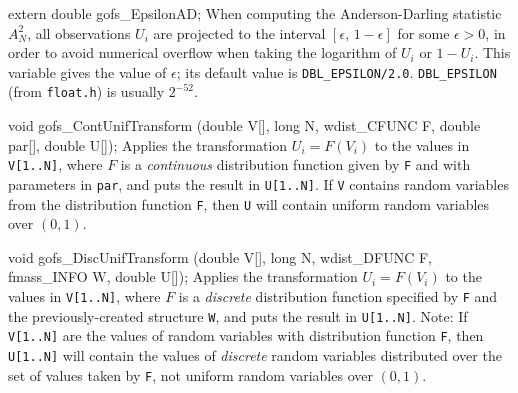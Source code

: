 extern double gofs_EpsilonAD;
\endcode
 \tab When computing the Anderson-Darling statistic $A_N^2$,
  all observations $U_i$ are projected to the interval
  $[\epsilon,\,1-\epsilon]$ for some $\epsilon > 0$, in order to
  avoid numerical overflow when taking the logarithm of $U_i$ or
  $1-U_i$.  This variable gives the value of $\epsilon$;
  its default value is {\tt DBL\_EPSILON/2.0}.
  {\tt DBL\_EPSILON} (from {\tt float.h}) is usually $2^{-52}$.
 \endtab
\fi %




\code

void gofs_ContUnifTransform (double V[], long N, wdist_CFUNC F,
                             double par[], double U[]);
\endcode
\tab  Applies the transformation $U_i = F(V_i)$ to the values in
  {\tt V[1..N]}, where $F$ is a {\em continuous\/} distribution function
  given by {\tt F} and with parameters in {\tt par},
  and puts the result in {\tt U[1..N]}.
  If {\tt V} contains random variables from the distribution function
  {\tt F}, then {\tt U} will contain uniform random variables over $(0,1)$.
\endtab
\code


void gofs_DiscUnifTransform (double V[], long N, wdist_DFUNC F,
                             fmass_INFO W, double U[]);
\endcode
\tab  Applies the transformation $U_i = F(V_i)$ to the values in
  {\tt V[1..N]}, where $F$ is a {\em discrete\/} distribution function
  specified by {\tt F} and the previously-created structure {\tt W},
  and puts the result in {\tt U[1..N]}.
  Note: If {\tt V[1..N]} are the values of random variables with
  distribution function {\tt F}, then {\tt U[1..N]} will contain
  the values of {\em discrete\/} random variables distributed over the
  set of values taken by {\tt F},
  not uniform random variables over $(0,1)$.
\endtab
\code


